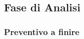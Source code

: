 \documentclass[../piano-di-progetto.tex]{subfiles}
\begin{document}
	\subsection{Fase di Analisi}
  \label{subsec:fase_di_analisi}
  \subsubsection{Preventivo a finire}
  \label{subsubsec:preventivo_a_finire}

  
  
\end{document}
